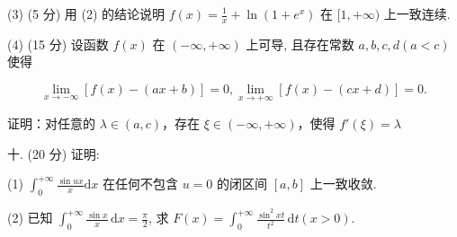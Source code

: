 \documentclass{examcollection}
\renewcommand{\displayformula}[1]{\[#1\]}
\begin{document}
{\begin{minipage}{\textwidth}
(3) (5 分) 用 (2) 的结论说明 $f(x) = \frac{1}{x} + \ln (1 + e^x)$ 在 $[1, +\infty)$ 上一致连续.\par
(4) (15 分) 设函数 $f(x)$ 在 $(- \infty, +\infty)$ 上可导, 且存在常数 $a, b, c, d (a < c)$ 使得\par
\displayformula{\lim _ {x \to - \infty} [ f (x) - (a x + b) ] = 0, \lim _ {x \to + \infty} [ f (x) - (c x + d) ] = 0.}\par
证明：对任意的 $\lambda \in (a, c)$，存在 $\xi \in (-\infty, +\infty)$，使得 $f'(\xi) = \lambda$\par
十. (20 分) 证明:\par
(1) $\int_0^{+\infty}\frac{\sin ux}{x}\mathrm{d}x$ 在任何不包含 $u = 0$ 的闭区间 $[a,b]$ 上一致收敛.\par
(2) 已知 $\int_0^{+\infty} \frac{\sin x}{x} \, \mathrm{d}x = \frac{\pi}{2}$, 求 $F(x) = \int_0^{+\infty} \frac{\sin^2 xt}{t^2} \, \mathrm{d}t (x > 0)$.\par
\end{minipage}}
\ifdim\dimexpr\ht\proofbox+\dp\proofbox\relax>\textheight
\noindent\resizebox{!}{\textheight}{\usebox{\proofbox}}\else\noindent\usebox{\proofbox}\fi\clearpage
\end{document}
